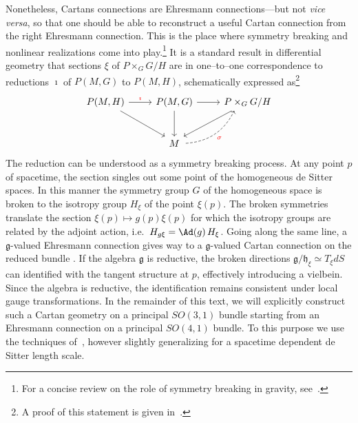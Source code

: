 \documentclass[11pt]{article}
\begin{document}
Nonetheless, Cartans connections are Ehresmann connections---but 
not \emph{vice versa}, so that one should be able to reconstruct 
a useful Cartan connection from the right Ehresmann connection.
This is the place where symmetry breaking and nonlinear 
realizations come into play.\footnote{For a concise review on the 
	role of symmetry breaking in gravity, 
	see~\cite{Wise:2011-sym.br}.} It is a standard result in 
differential geometry that sections $\xi$ of $P \times_G G/H$ are 
in one--to--one correspondence to reductions $\imath$ of $P(M,G)$ 
to $P(M,H)$, schematically expressed as\footnote{A proof of this 
	statement is given in~\cite{kob1996found}.}
\begin{displaymath}
\begin{tikzcd}[row sep=large]
	P(M,H)	\arrow{r}[color=red]{\imath}
				\arrow[end anchor=north west]{dr}
				& P(M,G)
					\arrow{r}
					\arrow{d}
				& P \times_G G/H
					\arrow[end anchor=north east]{dl}	\\
				& M \arrow[dashed,bend right,
						start anchor={[xshift=+2pt]real east},
						end anchor={[xshift=+15pt]south west}
						]{ur}[swap,color=red]{\sigma}
\end{tikzcd}
\end{displaymath}
The reduction can be understood as a symmetry breaking process.  
At any point $p$ of spacetime, the section singles out some point 
of the homogeneous de Sitter spaces. In this manner the symmetry 
group $G$ of the homogeneous space is broken to the isotropy 
group $H_\xi$ of the point $\xi(p)$. The broken symmetries 
translate the section $\xi(p) \mapsto g(p)\xi(p)$ for which the 
isotropy groups are related by the adjoint action, i.e.~$H_{g\xi} 
= \Ad(g)\, H_\xi$. Going along the same line, a 
$\mathfrak{g}$-valued Ehresmann connection gives way to a 
$\mathfrak{g}$-valued Cartan connection on the reduced bundle 
\cite{sharpe1997diff_geo}.  If the algebra $\mathfrak{g}$ is 
reductive, the broken directions $\mathfrak{g}/\mathfrak{h}_\xi 
\simeq T_\xi dS$ can identified with the tangent structure at 
$p$, effectively introducing a vielbein. Since the algebra is 
reductive, the identification remains consistent under local 
gauge transformations. In the remainder of this text, we will 
explicitly construct such a Cartan geometry on a principal 
$SO(3,1)$ bundle starting from an Ehresmann connection on a 
principal $SO(4,1)$ bundle. To this purpose we use the techniques 
of~\cite{Stelle:1979va,stelle.west:1980ds}, however slightly 
generalizing for a spacetime dependent de Sitter length scale.
\end{document}

